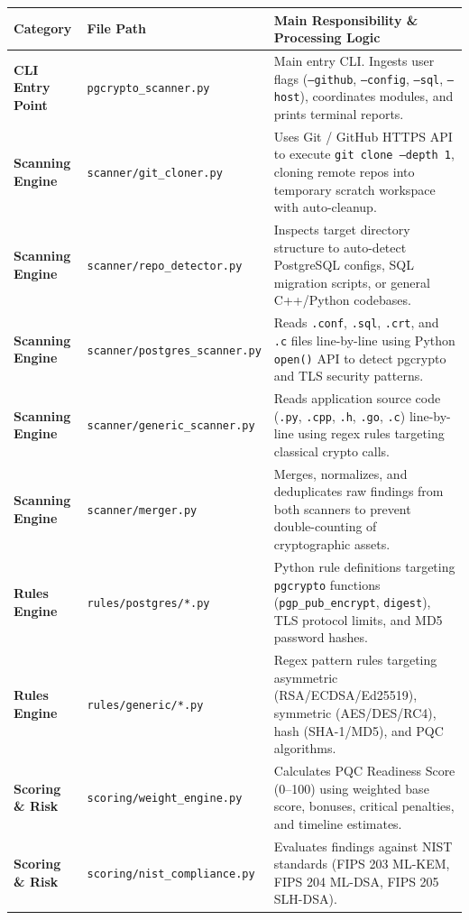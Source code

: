 \documentclass[11pt,a4paper,landscape]{article}
\begin{document}
{\small
\begin{tabularx}{\linewidth}{l l X}
\toprule
\textbf{Category} & \textbf{File Path} & \textbf{Main Responsibility \& Processing Logic} \\
\midrule
\textbf{CLI Entry Point} & \texttt{pgcrypto\_scanner.py} & Main entry CLI. Ingests user flags (\texttt{--github}, \texttt{--config}, \texttt{--sql}, \texttt{--host}), coordinates modules, and prints terminal reports. \\
\textbf{Scanning Engine} & \texttt{scanner/git\_cloner.py} & Uses Git / GitHub HTTPS API to execute \texttt{git clone --depth 1}, cloning remote repos into temporary scratch workspace with auto-cleanup. \\
\textbf{Scanning Engine} & \texttt{scanner/repo\_detector.py} & Inspects target directory structure to auto-detect PostgreSQL configs, SQL migration scripts, or general C++/Python codebases. \\
\textbf{Scanning Engine} & \texttt{scanner/postgres\_scanner.py} & Reads \texttt{.conf}, \texttt{.sql}, \texttt{.crt}, and \texttt{.c} files line-by-line using Python \texttt{open()} API to detect pgcrypto and TLS security patterns. \\
\textbf{Scanning Engine} & \texttt{scanner/generic\_scanner.py} & Reads application source code (\texttt{.py}, \texttt{.cpp}, \texttt{.h}, \texttt{.go}, \texttt{.c}) line-by-line using regex rules targeting classical crypto calls. \\
\textbf{Scanning Engine} & \texttt{scanner/merger.py} & Merges, normalizes, and deduplicates raw findings from both scanners to prevent double-counting of cryptographic assets. \\
\textbf{Rules Engine} & \texttt{rules/postgres/*.py} & Python rule definitions targeting \texttt{pgcrypto} functions (\texttt{pgp\_pub\_encrypt}, \texttt{digest}), TLS protocol limits, and MD5 password hashes. \\
\textbf{Rules Engine} & \texttt{rules/generic/*.py} & Regex pattern rules targeting asymmetric (RSA/ECDSA/Ed25519), symmetric (AES/DES/RC4), hash (SHA-1/MD5), and PQC algorithms. \\
\textbf{Scoring \& Risk} & \texttt{scoring/weight_engine.py} & Calculates PQC Readiness Score (0--100) using weighted base score, bonuses, critical penalties, and timeline estimates. \\
\textbf{Scoring \& Risk} & \texttt{scoring/nist_compliance.py} & Evaluates findings against NIST standards (FIPS 203 ML-KEM, FIPS 204 ML-DSA, FIPS 205 SLH-DSA). \\

\end{tabularx}}
\end{document}
